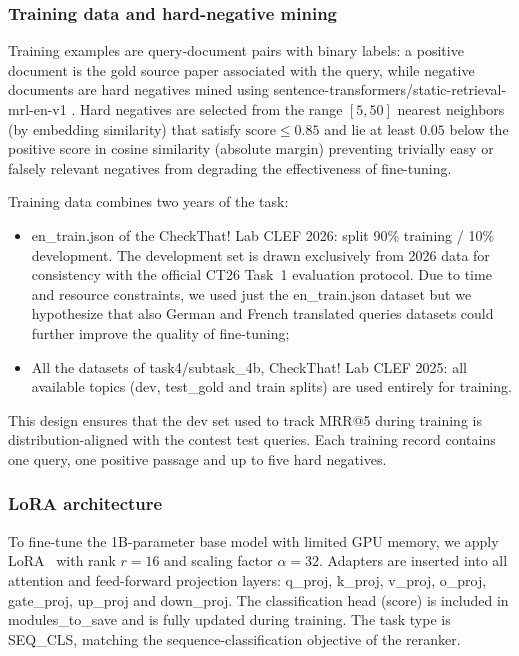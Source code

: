 \subsubsection{Training data and hard-negative mining}
Training examples are query-document pairs with binary labels: a positive document is the gold source paper associated with the query, while negative documents are hard negatives mined using sentence-transformers/static-retrieval-mrl-en-v1 \cite{static-retrieval-mrl-en-v1, reimers-2019-sentence-bert, kusupati2024matryoshka}. Hard negatives are selected from the range $[5, 50]$ nearest neighbors (by embedding similarity) that satisfy $\text{score} \leq 0.85$ and lie at least $0.05$ below the positive score in cosine similarity (absolute margin) preventing trivially easy or falsely relevant negatives from degrading the effectiveness of fine-tuning.

Training data combines two years of the task:
\begin{itemize}
    \item en\_train.json of the CheckThat! Lab CLEF 2026: split 90\% training / 10\% development. The development set is drawn exclusively from 2026 data for consistency with the official CT26 Task~1 evaluation protocol. Due to time and resource constraints, we used just the en\_train.json dataset but we hypothesize that also German and French translated queries datasets could further improve the quality of fine-tuning;
    \item All the datasets of task4/subtask\_4b, CheckThat! Lab CLEF 2025: all available topics (dev, test\_gold and train splits) are used entirely for training.
    
\end{itemize}
This design ensures that the dev set used to track MRR@5 during training is distribution-aligned with the contest test queries. Each training record contains one query, one positive passage and up to five hard negatives.

\subsubsection{LoRA architecture}
To fine-tune the 1B-parameter base model with limited GPU memory, we apply LoRA~\cite{hu2022lora} with rank $r = 16$ and scaling factor $\alpha = 32$. Adapters are inserted into all attention and feed-forward projection layers:
q\_proj, k\_proj, v\_proj, o\_proj, gate\_proj, up\_proj and down\_proj.
The classification head (score) is included in
modules\_to\_save and is fully updated during training. The task type is SEQ\_CLS, matching the sequence-classification objective of the reranker.

